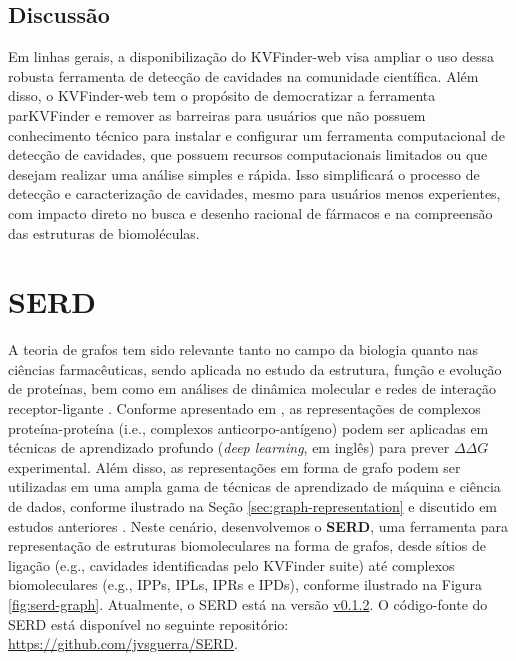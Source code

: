 \documentclass[Portugues]{phdquali}
\def\ie{i.e.\onedot}
\def\eg{e.g.\onedot}
\begin{document}
\subsection{Discussão}

Em linhas gerais, a disponibilização do KVFinder-web visa ampliar o uso dessa robusta ferramenta de detecção de cavidades na comunidade científica. Além disso, o KVFinder-web tem o propósito de democratizar a ferramenta parKVFinder e remover as barreiras para usuários que não possuem conhecimento técnico para instalar e configurar um ferramenta computacional de detecção de cavidades, que possuem recursos computacionais limitados ou que desejam realizar uma análise simples e rápida. Isso simplificará o processo de detecção e caracterização de cavidades, mesmo para usuários menos experientes, com impacto direto no busca e desenho racional de fármacos e na compreensão das estruturas de biomoléculas.

\section{SERD \label{sec:serd}}

A teoria de grafos tem sido relevante tanto no campo da biologia quanto nas ciências farmacêuticas, sendo aplicada no estudo da estrutura, função e evolução de proteínas, bem como em análises de dinâmica molecular e redes de interação receptor-ligante \cite{vishveshwara2002,mason2007,hummer2023}. Conforme apresentado em \cite{hummer2023}, as representações de complexos proteína-proteína (\ie, complexos anticorpo-antígeno) podem ser aplicadas em técnicas de aprendizado profundo (\textit{deep learning}, em inglês) para prever $\Delta \Delta G$ experimental. Além disso, as representações em forma de grafo podem ser utilizadas em uma ampla gama de técnicas de aprendizado de máquina e ciência de dados, conforme ilustrado na Seção \ref{sec:graph-representation} e discutido em estudos anteriores \cite{majeed2020,vishveshwara2002,mason2007}. Neste cenário, desenvolvemos o \textbf{SERD}, uma ferramenta para representação de estruturas biomoleculares na forma de grafos, desde sítios de ligação (\eg, cavidades identificadas pelo KVFinder suite) até complexos biomoleculares (\eg, IPPs, IPLs, IPRs e IPDs), conforme ilustrado na Figura \ref{fig:serd-graph}. Atualmente, o SERD está na versão \href{https://github.com/jvsguerra/SERD/tree/v0.1.2}{v0.1.2}. O código-fonte do SERD está disponível no seguinte repositório: \url{https://github.com/jvsguerra/SERD}.
\end{document}
